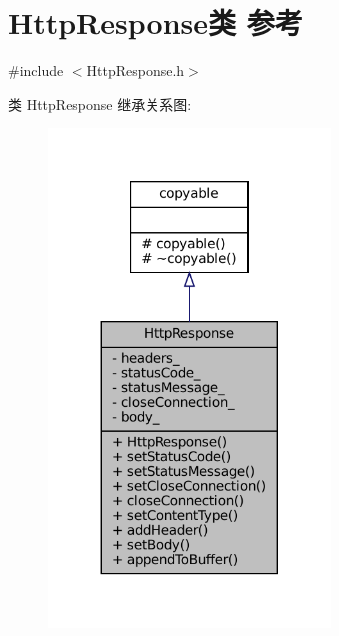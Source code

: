 \hypertarget{classmuduo_1_1net_1_1HttpResponse}{}\section{Http\+Response类 参考}
\label{classmuduo_1_1net_1_1HttpResponse}


{\ttfamily \#include $<$Http\+Response.\+h$>$}



类 Http\+Response 继承关系图\+:
\nopagebreak
\begin{figure}[H]
\begin{center}
\leavevmode
\includegraphics[width=212pt]{classmuduo_1_1net_1_1HttpResponse__inherit__graph}
\end{center}
\end{figure}


